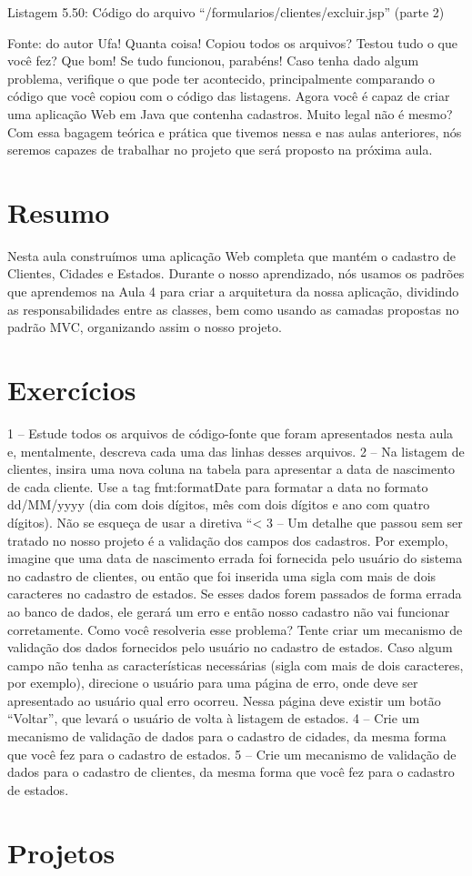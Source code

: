 Listagem 5.50: Código do arquivo ``/formularios/clientes/excluir.jsp'' (parte 2)
 
Fonte: do autor
Ufa! Quanta coisa! Copiou todos os arquivos? Testou tudo o que você fez? Que bom! Se tudo funcionou, parabéns! Caso tenha dado algum problema, verifique o que pode ter acontecido, principalmente comparando o código que você copiou com o código das listagens. Agora você é capaz de criar uma aplicação Web em Java que contenha cadastros. Muito legal não é mesmo? Com essa bagagem teórica e prática que tivemos nessa e nas aulas anteriores, nós seremos capazes de trabalhar no projeto que será proposto na próxima aula.


\section{Resumo}

Nesta aula construímos uma aplicação Web completa que mantém o cadastro de Clientes, Cidades e Estados. Durante o nosso aprendizado, nós usamos os padrões que aprendemos na Aula 4 para criar a arquitetura da nossa aplicação, dividindo as responsabilidades entre as classes, bem como usando as camadas propostas no padrão MVC, organizando assim o nosso projeto. 

\section{Exercícios}

1 – Estude todos os arquivos de código-fonte que foram apresentados nesta aula e, mentalmente, descreva cada uma das linhas desses arquivos.
2 – Na listagem de clientes, insira uma nova coluna na tabela para apresentar a data de nascimento de cada cliente. Use a tag fmt:formatDate para formatar a data no formato dd/MM/yyyy (dia com dois dígitos, mês com dois dígitos e ano com quatro dígitos). Não se esqueça de usar a diretiva ``<%
3 – Um detalhe que passou sem ser tratado no nosso projeto é a validação dos campos dos cadastros. Por exemplo, imagine que uma data de nascimento errada foi fornecida pelo usuário do sistema no cadastro de clientes, ou então que foi inserida uma sigla com mais de dois caracteres no cadastro de estados. Se esses dados forem passados de forma errada ao banco de dados, ele gerará um erro e então nosso cadastro não vai funcionar corretamente. Como você resolveria esse problema? Tente criar um mecanismo de validação dos dados fornecidos pelo usuário no cadastro de estados. Caso algum campo não tenha as características necessárias (sigla com mais de dois caracteres, por exemplo), direcione o usuário para uma página de erro, onde deve ser apresentado ao usuário qual erro ocorreu. Nessa página deve existir um botão ``Voltar'', que levará o usuário de volta à listagem de estados.
4 – Crie um mecanismo de validação de dados para o cadastro de cidades, da mesma forma que você fez para o cadastro de estados.
5 – Crie um mecanismo de validação de dados para o cadastro de clientes, da mesma forma que você fez para o cadastro de estados.


\section{Projetos}